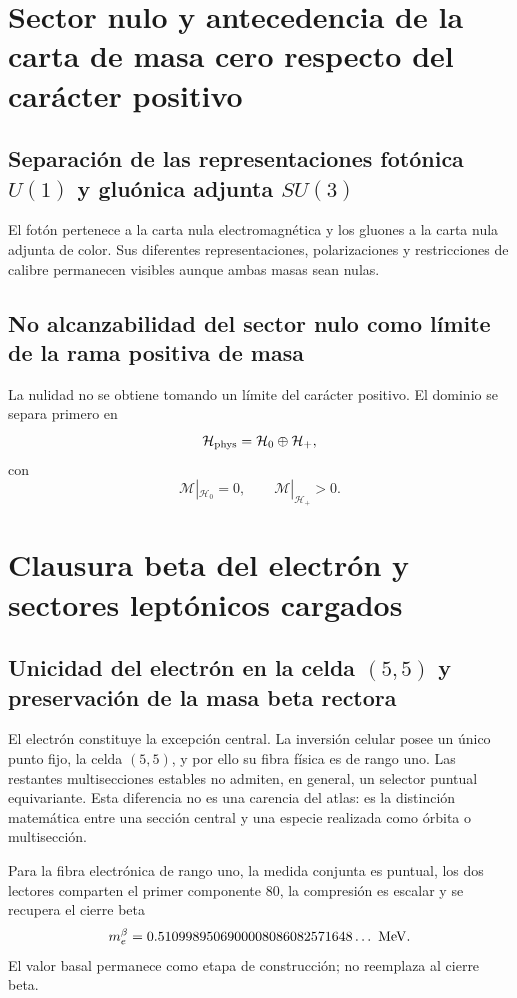 \section{Sector nulo y antecedencia de la carta de masa cero respecto del carácter positivo}

\subsection{Separación de las representaciones fotónica \texorpdfstring{\(U(1)\)}{U(1)} y gluónica adjunta \texorpdfstring{\(SU(3)\)}{SU(3)}}

El fotón pertenece a la carta nula electromagnética y los gluones a la carta
nula adjunta de color. Sus diferentes representaciones, polarizaciones y
restricciones de calibre permanecen visibles aunque ambas masas sean nulas.

\subsection{No alcanzabilidad del sector nulo como límite de la rama positiva de masa}

La nulidad no se obtiene tomando un límite del carácter positivo. El dominio
se separa primero en
\[
 \mathcal H_{\rm phys}=\mathcal H_0\oplus\mathcal H_+,
\]
con
\[
 \mathcal M|_{\mathcal H_0}=0,
 \qquad
 \mathcal M|_{\mathcal H_+}>0.
\]

\section{Clausura beta del electrón y sectores leptónicos cargados}

\subsection{Unicidad del electrón en la celda \texorpdfstring{\((5,5)\)}{(5,5)} y preservación de la masa beta rectora}

El electrón constituye la excepción central. La inversión celular posee un
único punto fijo, la celda \((5,5)\), y por ello su fibra física es de rango
uno. Las restantes multisecciones estables no admiten, en general, un selector
puntual equivariante. Esta diferencia no es una carencia del atlas: es la
distinción matemática entre una sección central y una especie realizada como
órbita o multisección.

Para la fibra electrónica de rango uno, la medida conjunta es puntual, los dos
lectores comparten el primer componente \(80\), la compresión es escalar y se
recupera el cierre beta
\[
 m_e^\beta
 =0.5109989506900008086082571648\ldots\ {\rm MeV}.
\]
El valor basal permanece como etapa de construcción; no reemplaza al cierre
beta.

